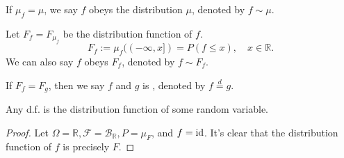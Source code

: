 If $\mu_f = \mu$, we say $f$ obeys the distribution $\mu$, denoted by
$f\sim \mu$. 

Let $F_f = F_{\mu_f}$ be the distribution function of $f$.
 \[
	 F_f := \mu_f ((-\infty,x]) = P(f\le x),\quad x\in \mathbb{R}.
\]
We can also say $f$ obeys $F_f$, denoted by $f\sim F_f$.

If $F_f = F_g$, then we say $f$ and $g$ is ,
denoted by  $f \overset{d}{=} g$. 

\begin{theorem}
	Any d.f. is the distribution function of some random variable.
\end{theorem}
\begin{proof}[Proof]
	Let $\Omega = \mathbb{R}, \mathscr{F} = \mathscr{B}_{\mathbb{R}},
	P=\mu_F$, and $f = \operatorname{id}$.
	It's clear that the distribution function of $f$ is precisely $F$.
\end{proof}
